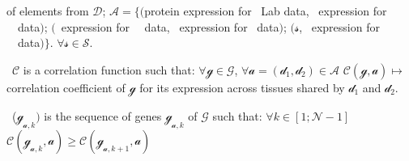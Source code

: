 \begin{minipage}{\textwidth}
\begin{eqlist}[\setlength{\itemsep}{0em}%
        \setlength{\topsep}{0em}%
        \setlength{\partopsep}{0em}%
        \setlength{\parskip}{0em}%
        \setlength{\parsep}{0em}]
             of elements from $\mathcal{D}$;
$\mathcal{A}=\{($protein expression for \pandey\ Lab data,
\mRNA\ expression for \uhlen\ \etal\ data$)$;
$($\mRNA\ expression for \uhlen\ \etal\ data,
\mRNA\ expression for \gtex\ data$)$;
$(\mathcal{s}$,
\mRNA\ expression for \uhlen\ \etal\ data$)\}$.
$\forall \mathcal{s} \in \mathcal{S}$.
\item[\textbullet\ $\mathcal{C}$] is a correlation function such that:
$\forall \mathcal{g} \in \mathcal{G}$,
$\forall \mathcal{a} = (\mathcal{d}_1,\mathcal{d}_2)
\in \mathcal{A}$
$\mathcal{C}(\mathcal{g},\mathcal{a}) \longmapsto$ correlation
coefficient of $\mathcal{g}$ for its expression across tissues
shared by $\mathcal{d}_1$ and $\mathcal{d}_2$.
\item[\textbullet\ ($\mathcal{g}_{\mathcal{a},k})$] is the sequence of
genes $\mathcal{g}_{\mathcal{a},k}$ of $\mathcal{G}$ such that:
$\forall k \in [1; \mathcal{N}-1]$
$\mathcal{C}(\mathcal{g}_{\mathcal{a},k},\mathcal{a}) ≥
\mathcal{C}(\mathcal{g}_{\mathcal{a},k+1},\mathcal{a})$
\end{eqlist}
\end{minipage}

